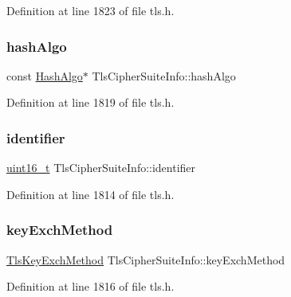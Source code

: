 Definition at line 1823 of file tls.\+h.

\mbox{\label{structTlsCipherSuiteInfo_a3386dc6ed6d7e5ed8b5cb9f233de1fa0}} 
\subsubsection{\texorpdfstring{hash\+Algo}{hashAlgo}}
{\footnotesize\ttfamily const \hyperlink{structHashAlgo}{Hash\+Algo}$\ast$ Tls\+Cipher\+Suite\+Info\+::hash\+Algo}



Definition at line 1819 of file tls.\+h.

\mbox{\label{structTlsCipherSuiteInfo_a17e954d45a02edb1a6dd25a490f20248}} 
\subsubsection{\texorpdfstring{identifier}{identifier}}
{\footnotesize\ttfamily \hyperlink{stdint_8h_a273cf69d639a59973b6019625df33e30}{uint16\+\_\+t} Tls\+Cipher\+Suite\+Info\+::identifier}



Definition at line 1814 of file tls.\+h.

\mbox{\label{structTlsCipherSuiteInfo_a79b95a8e28593fdb1981bd8bf50b3d22}} 
\subsubsection{\texorpdfstring{key\+Exch\+Method}{keyExchMethod}}
{\footnotesize\ttfamily \hyperlink{tls_8h_a10c9078f6485419c2b8644b573ef0b75}{Tls\+Key\+Exch\+Method} Tls\+Cipher\+Suite\+Info\+::key\+Exch\+Method}



Definition at line 1816 of file tls.\+h.

